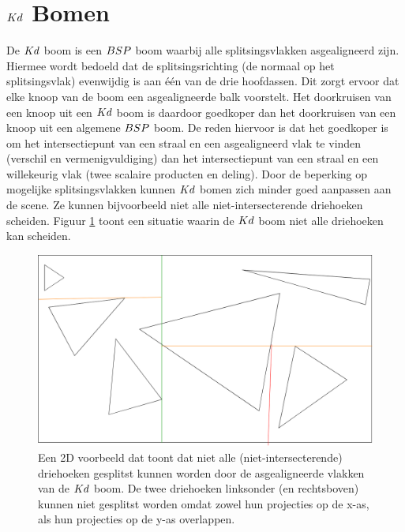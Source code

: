    
\section{$Kd$ Bomen}   
    De $Kd$ boom is een $BSP$ boom waarbij alle splitsingsvlakken asgealigneerd zijn.
    Hiermee wordt bedoeld dat de splitsingsrichting (de normaal op het splitsingsvlak) evenwijdig is aan één van de drie hoofdassen.
    Dit zorgt ervoor dat elke knoop van de boom een asgealigneerde balk voorstelt.
    Het doorkruisen van een knoop uit een $Kd$ boom is daardoor goedkoper dan het doorkruisen van een knoop uit een algemene $BSP$ boom.
    De reden hiervoor is dat het goedkoper is om het intersectiepunt van een straal en een asgealigneerd vlak te vinden (verschil en vermenigvuldiging) dan het intersectiepunt van een straal en een willekeurig vlak (twee scalaire producten en deling).
    Door de beperking op mogelijke splitsingsvlakken kunnen $Kd$ bomen zich minder goed aanpassen aan de scene.
    Ze kunnen bijvoorbeeld niet alle niet-intersecterende driehoeken scheiden. 
    Figuur \ref{fig:splitsing-kd} toont een situatie waarin de $Kd$ boom niet alle driehoeken kan scheiden.
    \\ %

    \begin{figure}
        \centering
        \includegraphics[width=\linewidth]{img/splitsing-Kd}
        \caption{Een 2D voorbeeld dat toont dat niet alle (niet-intersecterende) driehoeken gesplitst kunnen worden door de asgealigneerde vlakken van de $Kd$ boom. De twee driehoeken linksonder (en rechtsboven) kunnen niet gesplitst worden omdat zowel hun projecties op de x-as, als hun projecties op de y-as overlappen.}
        \label{fig:splitsing-kd}    
    \end{figure}

